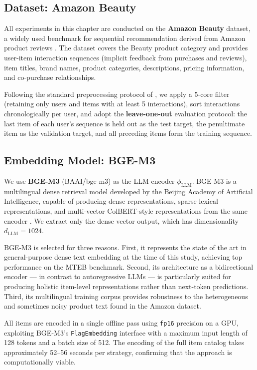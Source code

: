 \documentclass[12pt,a4paper]{report}
\newcommand{\textcite}[1]{\citet{#1}}
\newcommand{\parencite}[1]{\citep{#1}}
\begin{document}
\subsection{Dataset: Amazon Beauty}

All experiments in this chapter are conducted on the
\textbf{Amazon Beauty} dataset, a widely used benchmark for
sequential recommendation derived from Amazon product reviews
\parencite{mcauley2015image}. The dataset covers the Beauty
product category and provides user-item interaction sequences
(implicit feedback from purchases and reviews), item titles,
brand names, product categories, descriptions, pricing information,
and co-purchase relationships.

Following the standard preprocessing protocol of
\textcite{kang2018self}, we apply a 5-core filter (retaining only
users and items with at least 5 interactions), sort interactions
chronologically per user, and adopt the \textbf{leave-one-out}
evaluation protocol: the last item of each user's sequence is
held out as the test target, the penultimate item as the validation
target, and all preceding items form the training sequence.

\subsection{Embedding Model: BGE-M3}

We use \textbf{BGE-M3} (BAAI/bge-m3) as the LLM encoder
$\phi_{\text{LLM}}$. BGE-M3 is a multilingual dense retrieval
model developed by the Beijing Academy of Artificial Intelligence,
capable of producing dense representations, sparse lexical
representations, and multi-vector ColBERT-style representations
from the same encoder \parencite{chen2024bgem3}. We extract only
the dense vector output, which has dimensionality $d_{\text{LLM}}
= 1024$.

BGE-M3 is selected for three reasons. First, it represents the
state of the art in general-purpose dense text embedding at the
time of this study, achieving top performance on the MTEB
benchmark. Second, its architecture as a bidirectional encoder
--- in contrast to autoregressive LLMs --- is particularly suited
for producing holistic item-level representations rather than
next-token predictions. Third, its multilingual training corpus
provides robustness to the heterogeneous and sometimes noisy
product text found in the Amazon dataset.

All items are encoded in a single offline pass using
\texttt{fp16} precision on a GPU, exploiting BGE-M3's
\texttt{FlagEmbedding} interface with a maximum input length
of 128 tokens and a batch size of 512. The encoding of the full
item catalog takes approximately 52--56 seconds per strategy,
confirming that the approach is computationally viable.
\end{document}

